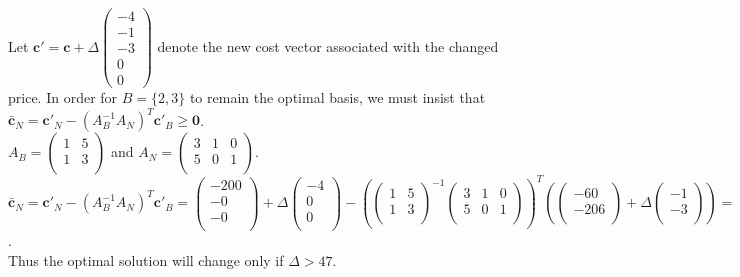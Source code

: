 \documentclass{article}
\begin{document}
Let $\mathbf{c}' = \mathbf{c} + \Delta \left( \begin{array}{c} -4\\-1\\-3\\0\\0 \end{array} \right)$ denote the new cost vector associated with the changed price. In order for $B = \{2, 3\}$ to remain the optimal basis, we must insist that $\bar{\mathbf{c}}_N = \mathbf{c}'_N - (A_B^{-1}A_N)^T \mathbf{c}'_B \ge \mathbf{0}$.\\
$A_B = \left( \begin{array}{cc} 1 & 5\\ 1 & 3\\ \end{array} \right)$ and $A_N = \left( \begin{array}{ccc} 3 & 1 & 0\\ 5 & 0 & 1\\ \end{array} \right)$.\\
$\bar{\mathbf{c}}_N = \mathbf{c}'_N - (A_B^{-1}A_N)^T \mathbf{c}'_B = \left( \begin{array}{c} -200\\-0\\-0\\ \end{array} \right) + \Delta \left( \begin{array}{c} -4\\0\\0\\ \end{array} \right) - (\left( \begin{array}{cc} 1 & 5\\ 1 & 3\\ \end{array} \right)^{-1} \left( \begin{array}{ccc} 3 & 1 & 0\\ 5 & 0 & 1\\ \end{array} \right))^T (\left( \begin{array}{c} -60\\-206\\ \end{array} \right) + \Delta \left( \begin{array}{c} -1\\-3\\ \end{array} \right)) = \left( \begin{array}{c} 74 + \Delta\\ 13\\ 47 + \Delta \end{array} \right) \ge \mathbf{0}$.\\
Thus the optimal solution will change only if $\Delta > 47$.
\end{document}
